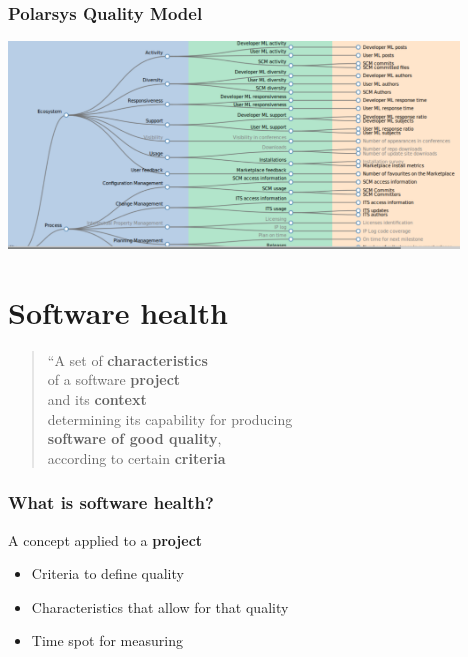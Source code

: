 \documentclass[17pt,aspectratio=169,hyperref=pdfusetitle]{beamer}
\begin{document}
\begin{frame}[fragile]
  \frametitle{Polarsys Quality Model}

  \begin{center}
  \includegraphics[height=5.5cm]{figs/polarsys-all}
  \end{center}  
  
\end{frame}

\section{Software health}

\begin{frame}[fragile]

  
  {\em
    \begin{quote}
      ``A set of \textbf{characteristics} \\
      of a software \textbf{project} \\
      and its \textbf{context} \\
      determining its capability for producing \\
      \textbf{software of good quality}, \\
      according to certain \textbf{criteria}
  \end{quote}
  }
  
\end{frame}


\begin{frame}[fragile]
  \frametitle{What is software health?}

  A concept applied to a \textbf{project}
  
  \begin{itemize}
  \item Criteria to define quality
  \item Characteristics that allow for that quality
  \item Time spot for measuring
  \end{itemize}
\end{frame}
\end{document}
